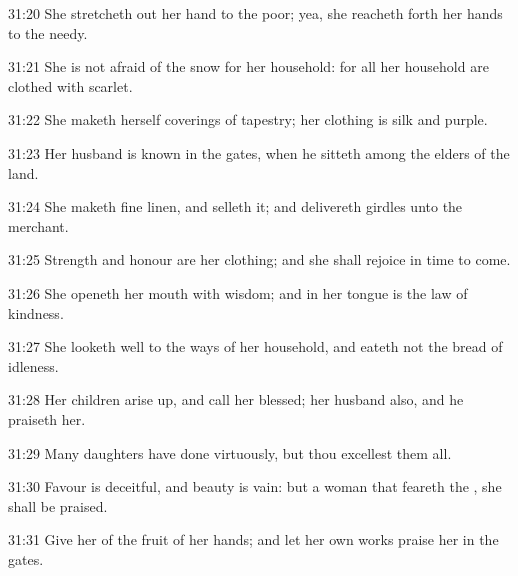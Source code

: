 31:20 She stretcheth out her hand to the poor; yea, she reacheth forth her hands to the needy.

31:21 She is not afraid of the snow for her household: for all her household are clothed with scarlet.

31:22 She maketh herself coverings of tapestry; her clothing is silk and purple.

31:23 Her husband is known in the gates, when he sitteth among the elders of the land.

31:24 She maketh fine linen, and selleth it; and delivereth girdles unto the merchant.

31:25 Strength and honour are her clothing; and she shall rejoice in time to come.

31:26 She openeth her mouth with wisdom; and in her tongue is the law of kindness.

31:27 She looketh well to the ways of her household, and eateth not the bread of idleness.

31:28 Her children arise up, and call her blessed; her husband also, and he praiseth her.

31:29 Many daughters have done virtuously, but thou excellest them all.

31:30 Favour is deceitful, and beauty is vain: but a woman that feareth the \LORD, she shall be praised.

31:31 Give her of the fruit of her hands; and let her own works praise her in the gates.

